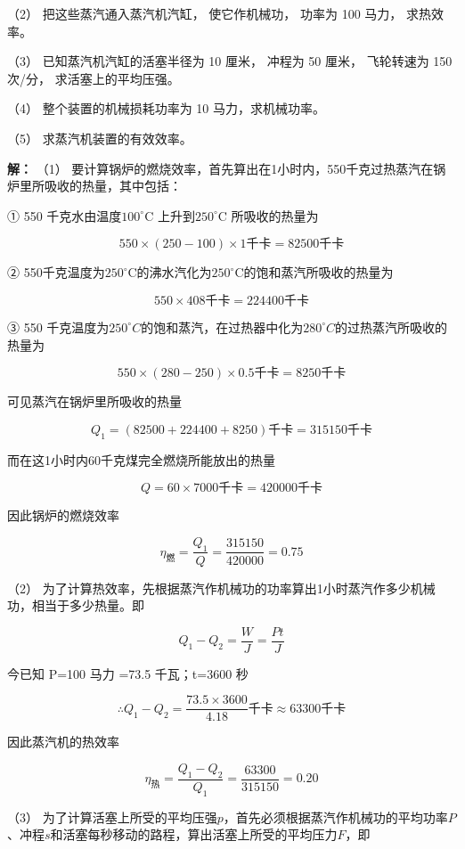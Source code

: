 （2） 把这些蒸汽通入蒸汽机汽缸， 使它作机械功， 功率为 100 马力，
求热效率。

（3） 已知蒸汽机汽缸的活塞半径为 10 厘米， 冲程为 50 厘米， 飞轮转速为
150 次/分， 求活塞上的平均压强。

（4） 整个装置的机械损耗功率为 10 马力，求机械功率。

（5） 求蒸汽机装置的有效效率。

\textbf{解：} （1）
要计算锅炉的燃烧效率，首先算出在1小时内，550千克过热蒸汽在锅炉里所吸收的热量，其中包括：

① 550 千克水由温度\(100^{\circ}\)C 上升到\(250^{\circ}\)C 所吸收的热量为

\[
550 \times (250 - 100) \times 1 \text{千卡} = 82500 \text{千卡}
\]

②
550千克温度为\(250^{\circ} \mathrm{C}\)的沸水汽化为\(250^{\circ} \mathrm{C}\)的饱和蒸汽所吸收的热量为

\[
550 \times 408 \text{千卡} = 224400 \text{千卡}
\]

③ 550
千克温度为\(250^{\circ}C\)的饱和蒸汽，在过热器中化为\(280^{\circ}C\)的过热蒸汽所吸收的热量为

\[
550 \times (280 - 250) \times 0.5 \text{千卡} = 8250 \text{千卡}
\]

可见蒸汽在锅炉里所吸收的热量

\[
Q _ {1} = (82500 + 224400 + 8250) \text{千卡} = 315150 \text{千卡}
\]

而在这1小时内60千克煤完全燃烧所能放出的热量

\[
Q = 60 \times 7000 \text{千卡} = 420000 \text{千卡}
\]

因此锅炉的燃烧效率

\[
\eta_ {\text{燃}} = \frac {Q _ {1}}{Q} = \frac {315150}{420000} = 0.75
\]

（2）
为了计算热效率，先根据蒸汽作机械功的功率算出1小时蒸汽作多少机械功，相当于多少热量。即

\[
Q _ {1} - Q _ {2} = \frac {W}{J} = \frac {P t}{J}
\]

今已知 P=100 马力 =73.5 千瓦；t=3600 秒

\[
\therefore Q _ {1} - Q _ {2} = \frac {73.5 \times 3600}{4.18} \text{千卡} \approx 63300 \text{千卡}
\]

因此蒸汽机的热效率

\[
\eta_ {\text{热}} = \frac {Q _ {1} - Q _ {2}}{Q _ {1}} = \frac {63300}{315150} = 0.20
\]

（3）
为了计算活塞上所受的平均压强\(p\)，首先必须根据蒸汽作机械功的平均功率\(P\)、冲程\(s\)和活塞每秒移动的路程，算出活塞上所受的平均压力\(F\)，即

